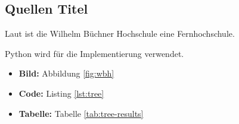 \subsection{Quellen Titel}
Laut \cite{Willhelm} ist die Wilhelm Büchner Hochschule eine Fernhochschule. \par
Python \cite{PythonDoc} wird für die Implementierung verwendet. \par\vspace\baselineskip
\begin{itemize}
    \item \textbf{Bild:} Abbildung \ref{fig:wbh}
    \item \textbf{Code:} Listing \ref{lst:tree}
    \item \textbf{Tabelle:} Tabelle \ref{tab:tree-results}
\end{itemize}


